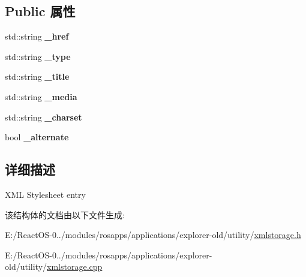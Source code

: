 \subsection*{Public 属性}
\begin{DoxyCompactItemize}
\item 
\mbox{\label{struct_x_m_l_storage_1_1_style_sheet_a8ba8b0d17f88751686f93ff9cb495bea}} 
std\+::string {\bfseries \+\_\+href}
\item 
\mbox{\label{struct_x_m_l_storage_1_1_style_sheet_aced5c1c1c8e0ca33c2651fe969d13d16}} 
std\+::string {\bfseries \+\_\+type}
\item 
\mbox{\label{struct_x_m_l_storage_1_1_style_sheet_a5d8b8bea75ce3e87725848ef0bcbb43c}} 
std\+::string {\bfseries \+\_\+title}
\item 
\mbox{\label{struct_x_m_l_storage_1_1_style_sheet_a92902f3951b32d16a51eb26491af57e1}} 
std\+::string {\bfseries \+\_\+media}
\item 
\mbox{\label{struct_x_m_l_storage_1_1_style_sheet_a115d86ee0b12a78c74d4f9295ec81cf5}} 
std\+::string {\bfseries \+\_\+charset}
\item 
\mbox{\label{struct_x_m_l_storage_1_1_style_sheet_a1d415ae856f23701cd6baf4dc540330b}} 
bool {\bfseries \+\_\+alternate}
\end{DoxyCompactItemize}


\subsection{详细描述}
X\+ML Stylesheet entry 

该结构体的文档由以下文件生成\+:\begin{DoxyCompactItemize}
\item 
E\+:/\+React\+O\+S-\/0../modules/rosapps/applications/explorer-\/old/utility/\hyperlink{xmlstorage_8h}{xmlstorage.\+h}\item 
E\+:/\+React\+O\+S-\/0../modules/rosapps/applications/explorer-\/old/utility/\hyperlink{xmlstorage_8cpp}{xmlstorage.\+cpp}\end{DoxyCompactItemize}
